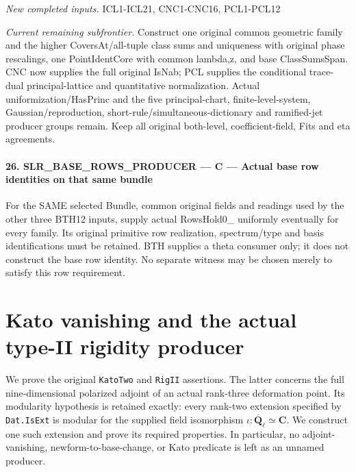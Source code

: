 \documentclass[11pt,a4paper]{article}
\numberwithin{equation}{section}
\theoremstyle{remark}\newtheorem{remark}[theorem]{Remark}
\begin{document}
\emph{New completed inputs.} ICL1-ICL21, CNC1-CNC16, PCL1-PCL12

\emph{Current remaining subfrontier.} Construct one original common geometric family and the higher CoversAt/all-tuple class sums and uniqueness with original phase rescalings, one PointIdentCore with common lambda,z, and base ClassSumsSpan. CNC now supplies the full original IsNab; PCL supplies the conditional trace-dual principal-lattice and quantitative normalization. Actual uniformization/HasPrinc and the five principal-chart, finite-level-system, Gaussian/reproduction, short-rule/simultaneous-dictionary and ramified-jet producer groups remain. Keep all original both-level, coefficient-field, Fits and eta agreements.



\paragraph{26. SLR\_\allowbreak BASE\_\allowbreak ROWS\_\allowbreak PRODUCER — C — Actual base row identities on that same bundle}

For the SAME selected Bundle, common original fields and readings used by the other three BTH12 inputs, supply actual RowsHold0\_ uniformly eventually for every family. Its original primitive row realization, spectrum/type and basis identifications must be retained. BTH supplies a theta consumer only; it does not construct the base row identity. No separate witness may be chosen merely to satisfy this row requirement.



\clearpage
\section{Kato vanishing and the actual type-II rigidity producer}
\label{sec:type-ii-rigidity-v47}

We prove the original \texttt{Kato\allowbreak Two} and \texttt{Rig\allowbreak II} assertions.
The latter concerns the full nine-dimensional polarized adjoint of an
actual rank-three deformation point.  Its modularity hypothesis is
retained exactly: every rank-two extension specified by
\texttt{Dat.\allowbreak Is\allowbreak Ext} is modular for the supplied field isomorphism
\(\iota:\overline{\mathbf Q}_\ell\simeq\mathbf C\).
We construct one such extension and prove its required properties.
In particular, no adjoint-vanishing, newform-to-base-change, or Kato
predicate is left as an unnamed producer.
\end{document}
